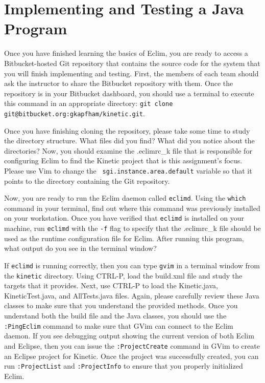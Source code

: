 \section*{Implementing and Testing a Java Program}

Once you have finished learning the basics of Eclim, you are ready to access a Bitbucket-hosted Git repository that
contains the source code for the system that you will finish implementing and testing.  First, the members of each team
should ask the instructor to share the Bitbucket repository with them. Once the repository is in your Bitbucket
dashboard, you should use a terminal to execute this command in an appropriate directory: {\tt git clone
git@bitbucket.org:gkapfham/kinetic.git}.

Once you have finishing cloning the repository, please take some time to study the directory structure.  What files did
you find? What did you notice about the directories?  Now, you should examine the .eclimrc\_k file that is responsible
for configuring Eclim to find the Kinetic project that is this assignment's focus.  Please use Vim to change the {\tt
sgi.instance.area.default} variable so that it points to the directory containing the Git repository. 

Now, you are ready to run the Eclim daemon called {\tt eclimd}.  Using the {\tt which} command in your terminal, find
out where this command was previously installed on your workstation.  Once you have verified that {\tt eclimd} is
installed on your machine, run {\tt eclimd} with the {\tt -f} flag to specify that the .eclimrc\_k file should be used
as the runtime configuration file for Eclim.  After running this program, what output do you see in the terminal window?

If {\tt eclimd} is running correctly, then you can type {\tt gvim} in a terminal window from the {\tt kinetic}
directory. Using CTRL-P, load the build.xml file and study the targets that it provides.  Next, use CTRL-P to load the
Kinetic.java, KineticTest.java, and AllTests.java files.  Again, please carefully review these Java classes to make sure
that you understand the provided methods. Once you understand both the build file and the Java classes, you should 
use the {\tt :PingEclim} command to make sure that GVim can connect to the Eclim daemon.  If you see debugging output
showing the current version of both Eclim and Eclipse, then you can issue the {\tt :ProjectCreate} command in GVim to
create an Eclipse project for Kinetic.  Once the project was successfully created, you can run {\tt :ProjectList}
and {\tt :ProjectInfo} to ensure that you properly initialized Eclim. 
 
